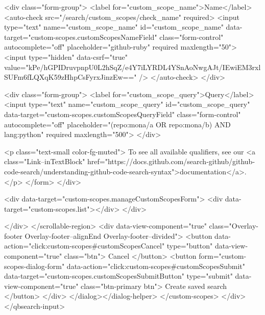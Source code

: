           <div class="form-group">
            <label for="custom_scope_name">Name</label>
            <auto-check src="/search/custom_scopes/check_name" required>
              <input
                type="text"
                name="custom_scope_name"
                id="custom_scope_name"
                data-target="custom-scopes.customScopesNameField"
                class="form-control"
                autocomplete="off"
                placeholder="github-ruby"
                required
                maxlength="50">
              <input type="hidden" data-csrf="true" value="kPe/hGPIDruvpnpU0L2hSqZ/e4Y7iLYRDL4YSnAoNwgAJt/IEwiEM3rxlSUFm6fLQXqK59zHhpCsFyrxJinzEw==" />
            </auto-check>
          </div>

          <div class="form-group">
            <label for="custom_scope_query">Query</label>
            <input
              type="text"
              name="custom_scope_query"
              id="custom_scope_query"
              data-target="custom-scopes.customScopesQueryField"
              class="form-control"
              autocomplete="off"
              placeholder="(repo:mona/a OR repo:mona/b) AND lang:python"
              required
              maxlength="500">
          </div>

          <p class="text-small color-fg-muted">
            To see all available qualifiers, see our <a class="Link--inTextBlock" href="https://docs.github.com/search-github/github-code-search/understanding-github-code-search-syntax">documentation</a>.
          </p>
</form>        </div>

        <div data-target="custom-scopes.manageCustomScopesForm">
          <div data-target="custom-scopes.list"></div>
        </div>

</div>
      </scrollable-region>
      <div data-view-component="true" class="Overlay-footer Overlay-footer--alignEnd Overlay-footer--divided">          <button data-action="click:custom-scopes#customScopesCancel" type="button" data-view-component="true" class="btn">    Cancel
</button>
          <button form="custom-scopes-dialog-form" data-action="click:custom-scopes#customScopesSubmit" data-target="custom-scopes.customScopesSubmitButton" type="submit" data-view-component="true" class="btn-primary btn">    Create saved search
</button>
</div>
</dialog></dialog-helper>
    </custom-scopes>
  </div>
</qbsearch-input>



